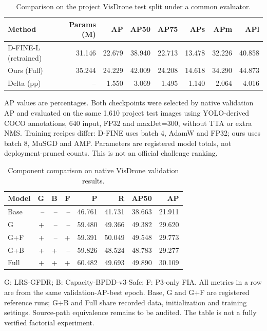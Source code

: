 \begin{table}[t]
\centering
\small
\setlength{\tabcolsep}{4pt}
\caption{Comparison on the project VisDrone test split under a common evaluator.}
\label{tab:selected-1}
\begin{tabular}{lrrrrrrr}
\toprule
Method & Params (M) & AP & AP50 & AP75 & APs & APm & APl \\
\midrule
D-FINE-L (retrained) & 31.146 & 22.679 & 38.940 & 22.713 & 13.478 & 32.226 & 40.858 \\
Ours (Full) & 35.244 & 24.229 & 42.009 & 24.208 & 14.618 & 34.290 & 44.873 \\
Delta (pp) & -- & 1.550 & 3.069 & 1.495 & 1.140 & 2.064 & 4.016 \\
\bottomrule
\end{tabular}
\par\smallskip
\begin{minipage}{0.97\textwidth}\footnotesize AP values are percentages. Both checkpoints were selected by native validation AP and evaluated on the same 1,610 project test images using YOLO-derived COCO annotations, 640 input, FP32 and maxDet=300, without TTA or extra NMS. Training recipes differ: D-FINE uses batch 4, AdamW and FP32; ours uses batch 8, MuSGD and AMP. Parameters are registered model totals, not deployment-pruned counts. This is not an official challenge ranking.\end{minipage}
\par\medskip
\end{table}

\begin{table}[t]
\centering
\small
\setlength{\tabcolsep}{4pt}
\caption{Component comparison on native VisDrone validation results.}
\label{tab:selected-2}
\begin{tabular}{lrrrrrrr}
\toprule
Model & G & B & F & P & R & AP50 & AP \\
\midrule
Base & -- & -- & -- & 46.761 & 41.731 & 38.663 & 21.911 \\
G & + & -- & -- & 59.480 & 49.366 & 49.382 & 29.620 \\
G+F & + & -- & + & 59.391 & 50.049 & 49.548 & 29.773 \\
G+B & + & + & -- & 59.826 & 48.524 & 48.783 & 29.277 \\
Full & + & + & + & 60.482 & 49.693 & 49.890 & 30.109 \\
\bottomrule
\end{tabular}
\par\smallskip
\begin{minipage}{0.97\textwidth}\footnotesize G: LRS-GFDR; B: Capacity-BPDD-v3-Safe; F: P3-only FIA. All metrics in a row are from the same validation-AP-best epoch. Base, G and G+F are registered reference runs; G+B and Full share recorded data, initialization and training settings. Source-path equivalence remains to be audited. The table is not a fully verified factorial experiment.\end{minipage}
\par\medskip
\end{table}

